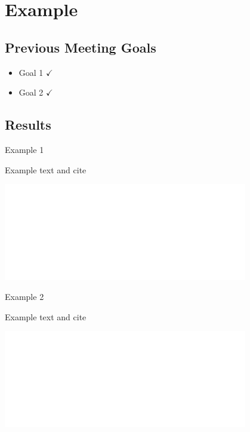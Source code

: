 \section{Example}



\subsection{Previous Meeting Goals}
\begin{frame}{}
\centering
\begin{minipage}{0.6\textwidth}
		\begin{itemize}
        \centering
			\item Goal 1 $\checkmark$
			\item Goal 2 $\checkmark$
		\end{itemize}
	\end{minipage}
\end{frame}



\subsection{Results}
\begin{frame}{Example 1}
    \begin{minipage}{0.5\textwidth}
    Example text and cite \cite{Bessa2017a}
    \end{minipage}%
    \colorbox{blue!20}{\begin{minipage}{0.5\textwidth}
        \includegraphics[width=0.8\textwidth]{_Example/Images/tud_white.pdf}   
    \end{minipage}}
\end{frame}

\begin{frame}{Example 2}
\begin{minipage}{0.5\textwidth}
	Example text and cite \cite{Bessa2017a}
\end{minipage}%
\colorbox{red!20}{\begin{minipage}{0.5\textwidth}
		\includegraphics[width=0.8\textwidth]{_Example/Images/tud_white.pdf}   
\end{minipage}}
\end{frame}



